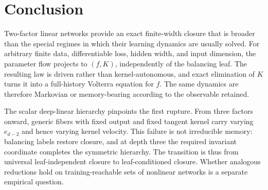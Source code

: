 \section{Conclusion}

Two-factor linear networks provide an exact finite-width closure that is broader than the special regimes in which their learning dynamics are usually solved.  For arbitrary finite data, differentiable loss, hidden width, and input dimension, the parameter flow projects to $(f,K)$, independently of the balancing leaf.  The resulting law is driven rather than kernel-autonomous, and exact elimination of $K$ turns it into a full-history Volterra equation for $f$.  The same dynamics are therefore Markovian or memory-bearing according to the observable retained.

The scalar deep-linear hierarchy pinpoints the first rupture.  From three factors onward, generic fibers with fixed output and fixed tangent kernel carry varying $e_{d-2}$ and hence varying kernel velocity.  This failure is not irreducible memory: balancing labels restore closure, and at depth three the required invariant coordinate completes the symmetric hierarchy.  The transition is thus from universal leaf-independent closure to leaf-conditioned closure.  Whether analogous reductions hold on training-reachable sets of nonlinear networks is a separate empirical question.
